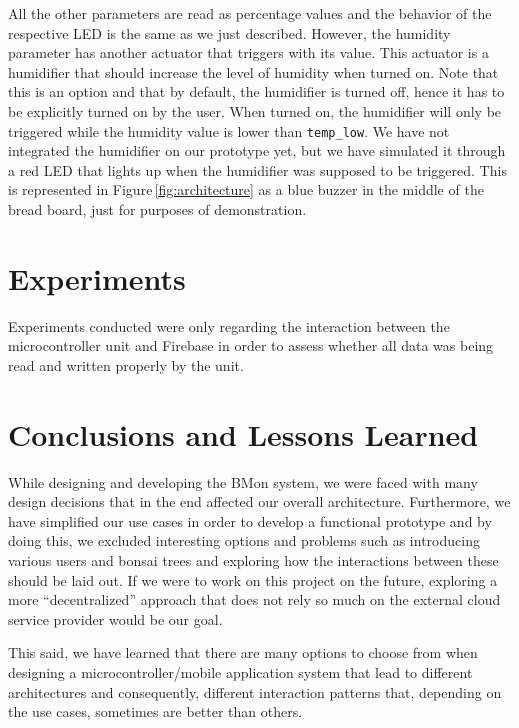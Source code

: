 \documentclass{article}
\begin{document}
All the other parameters are read as percentage values and the behavior of the
respective LED is the same as we just described. However, the humidity parameter
has another actuator that triggers with its value. This actuator is a humidifier
that should increase the level of humidity when turned on. Note that this is an
option and that by default, the humidifier is turned off, hence it has to be
explicitly turned on by the user. When turned on, the humidifier will only be
triggered while the humidity value is lower than \texttt{temp\_low}. We have not
integrated the humidifier on our prototype yet, but we have simulated it through
a red LED that lights up when the humidifier was supposed to be triggered. This
is represented in Figure\,\ref{fig:architecture} as a blue buzzer in the middle
of the bread board, just for purposes of demonstration.

\section{Experiments}\label{sec:experiments}
Experiments conducted were only regarding the interaction between the
microcontroller unit and Firebase in order to assess whether all data was being
read and written properly by the unit.


\section{Conclusions and Lessons Learned}\label{sec:conclusion}
While designing and developing the BMon system, we were faced with many design
decisions that in the end affected our overall architecture. Furthermore, we
have simplified our use cases in order to develop a functional prototype and by
doing this, we excluded interesting options and problems such as introducing
various users and bonsai trees and exploring how the interactions between these
should be laid out. If we were to work on this project on the future, exploring
a more ``decentralized'' approach that does not rely so much on the external
cloud service provider would be our goal.

This said, we have learned that there are many options to choose from when
designing a microcontroller/mobile application system that lead to different
architectures and consequently, different interaction patterns that, depending
on the use cases, sometimes are better than others.

\newpage


\end{document}
